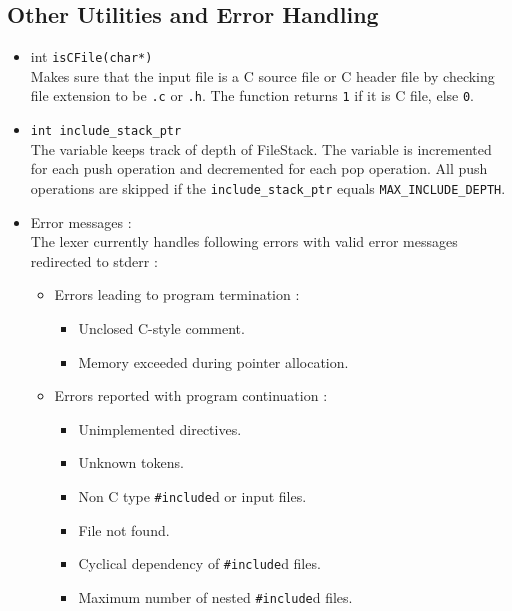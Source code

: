 \documentclass[12pt]{article}
\begin{document}
\subsection{Other Utilities and Error Handling}
\begin{itemize}
\item int \texttt{isCFile(char*)}
\\Makes sure that the input file is a C source file or C header file by checking file extension to be \texttt{.c} or \texttt{.h}. The function returns \texttt{1} if it is C file, else \texttt{0}.

\item \texttt{int include\_stack\_ptr}
\\ The variable keeps track of depth of FileStack. The variable is incremented for each push operation and decremented for each pop operation. All push operations are skipped if the \texttt{include\_stack\_ptr} equals \texttt{MAX\_INCLUDE\_DEPTH}.  


\item Error messages :
\\The lexer currently handles following errors with valid error messages redirected to stderr :
\begin{itemize}
 \item Errors leading to program termination :
 
\begin{itemize} 
\item Unclosed C-style comment.
\item Memory exceeded during pointer allocation.
\end{itemize}

\item Errors reported with program continuation :

\begin{itemize}
\item Unimplemented directives.
\item Unknown tokens.
\item Non C type \texttt{\#include}d or input files. 
\item File not found. 
\item Cyclical dependency of  \texttt{\#include}d files.
\item Maximum number of nested \texttt{\#include}d files.
\end{itemize}

\end{itemize}
\end{itemize}
\end{document}
